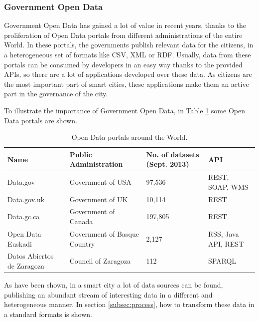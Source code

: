 \subsubsection{Government Open Data}

Government Open Data has gained a lot of value in recent years, thanks to the proliferation of Open Data portals from different administrations of the entire World. In these portals, the governments publish relevant data for the citizens, in a heterogeneous set of formats like CSV, XML or RDF. Usually, data from these portals can be consumed by developers in an easy way thanks to the provided APIs, so there are a lot of applications developed over these data. As citizens are the most important part of smart cities, these applications make them an active part in the governance of the city.

To illustrate the importance of Government Open Data, in Table \ref{tab:open data portals} some Open Data portals are shown.

    \begin{table}
        \center
        \begin{tabular}{|p{2cm}|p{3cm}|p{2.5cm}|p{2cm}|}
            \hline
            \textbf{Name} & \textbf{Public Administration} & \textbf{No. of datasets (Sept. 2013)} & \textbf{API} \\
            \hline \hline
            Data.gov & Government of USA & 97,536 & REST, SOAP, WMS\\
            \hline
            Data.gov.uk & Government of UK & 10,114 & REST \\
            \hline
            Data.gc.ca & Government of Canada & 197,805 & REST \\
            \hline
            Open Data Euskadi & Government of Basque Country & 2,127 & RSS, Java API, REST \\
            \hline
            Datos Abiertos de Zaragoza & Council of Zaragoza & 112 & SPARQL \\
            \hline
        \end{tabular}
        \caption{Open Data portals around the World.}
        \label{tab:open data portals}
    \end{table}

As have been shown, in a smart city a lot of data sources can be found, publishing an abundant stream of interesting data in a different and heterogeneous manner. In section \ref{subsec:process}, how to transform these data in a standard formats is shown.

